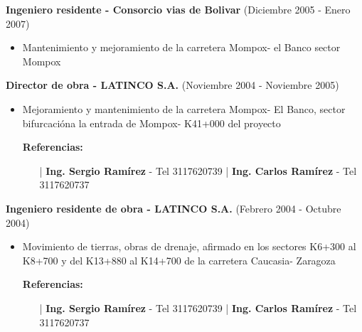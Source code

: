 \documentclass[letterpaper,10pt]{article}
\begin{document}
  \vspace*{0.1cm}
  \textbf{Ingeniero residente - Consorcio vias de Bolivar} (Diciembre 2005 - Enero 2007)
  \hfill
  \vspace*{0.1cm}
  \begin{minipage}{\linewidth}
    \begin{itemize}[noitemsep]
      \item Mantenimiento y mejoramiento de la carretera Mompox- el Banco sector Mompox
    \end{itemize}
    \hfill
  \end{minipage}
  
  \vspace*{0.1cm}
  \textbf{Director de obra - LATINCO S.A.} (Noviembre 2004 - Noviembre 2005)
  \hfill
  \vspace*{0.1cm}
  \begin{minipage}{\linewidth}
    \begin{itemize}[noitemsep]
      \item Mejoramiento y mantenimiento de la carretera Mompox- El Banco, sector bifurcacióna la entrada de Mompox- K41+000 del proyecto
      \item [] \textbf{Referencias:}
      \begin{itemize}[noitemsep]
        \vspace*{-0.2cm}
        \item [|] \textbf{Ing. Sergio Ramírez} - Tel 3117620739 | \textbf{Ing. Carlos Ramírez} - Tel 3117620737
      \end{itemize}
    \end{itemize}
    \hfill
  \end{minipage}
  
  \newpage

  \vspace*{0.1cm}
  \textbf{Ingeniero residente de obra - LATINCO S.A.} (Febrero 2004 - Octubre 2004)
  \hfill
  \vspace*{0.1cm}
  \begin{minipage}{\linewidth}
    \begin{itemize}[noitemsep]
      \item Movimiento de tierras, obras de drenaje, afirmado en los sectores K6+300 al K8+700 y del K13+880 al K14+700 de la carretera Caucasia- Zaragoza
      \item [] \textbf{Referencias:}
      \begin{itemize}[noitemsep]
        \vspace*{-0.2cm}
        \item [|] \textbf{Ing. Sergio Ramírez} - Tel 3117620739 | \textbf{Ing. Carlos Ramírez} - Tel 3117620737
      \end{itemize}
    \end{itemize}
    \hfill
  \end{minipage}
\end{document}
